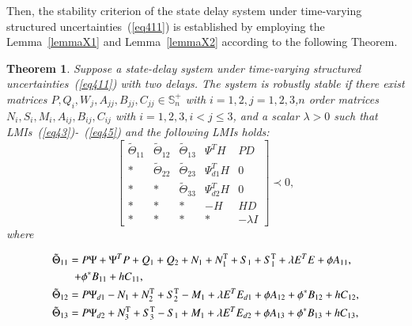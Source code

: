 \documentclass[journal]{IEEEtran}
\newtheorem{theorem}{Theorem}
\begin{document}
Then, the stability criterion of the state delay system under time-varying structured uncertainties~(\ref{eq411}) is established by employing the Lemma~\ref{lemmaX1} and Lemma~\ref{lemmaX2} according to the following Theorem.

\begin{theorem}
  Suppose a state-delay system under time-varying structured uncertainties~(\ref{eq411}) with two delays. The system is robustly stable if there exist matrices $P,Q_i,W_j,A_{jj},B_{jj},C_{jj}\in\mathbb{S}_n^+$ with $i=1,2,j=1,2,3$,$n$ order matrices $N_i,S_i,M_i,A_{ij},B_{ij},C_{ij}$ with $i=1,2,3,i<j\le3$, and a scalar $\lambda>0$ such that LMIs~(\ref{eq43})-~(\ref{eq45}) and the following LMIs holds:
  \begin{equation}
    \left[ {\begin{array}{*{20}{c}}
            {{{\tilde \Theta }_{11}}} & {{{\tilde \Theta }_{12}}} & {{{\tilde \Theta }_{13}}} & {{\Psi ^T}H}    & {PD}           \\
            *                         & {{{\tilde \Theta }_{22}}} & {{{\tilde \Theta }_{23}}} & {\Psi _{d1}^TH} & 0              \\
            *                         & *                         & {{{\tilde \Theta }_{33}}} & {\Psi _{d2}^TH} & 0              \\
            *                         & *                         & *                         & { - H}          & {HD}           \\
            *                         & *                         & *                         & *               & { - \lambda I}
          \end{array}} \right] \prec 0,
    \label{eq412}
  \end{equation}
  where
  \begin{small}
  \begin{equation*}
    \begin{gathered}
      {{\tilde \Theta }_{11}} = P\Psi  + {\Psi ^T}P + {Q_1} + {Q_2} + {N_1} + N_1^{\text{T}} + {S_1} + S_1^{\text{T}} + \lambda {E^T}E + \phi {A_{11}},\hfill\\
       \quad \quad + {\phi ^*}{B_{11}} + h{C_{11}}, \hfill \\
      {{\tilde \Theta }_{12}} = P{\Psi _{d1}} - {N_1} + N_2^{\text{T}} + S_2^{\text{T}} - {M_1} + \lambda {E^T}{E_{d1}} + \phi {A_{12}} + {\phi ^*}{B_{12}} + h{C_{12}}, \hfill \\
      {{\tilde \Theta }_{13}} = P{\Psi _{d2}} + N_3^{\text{T}} + S_3^{\text{T}} - {S_1} + {M_1} + \lambda {E^T}{E_{d2}} + \phi {A_{13}} + {\phi ^*}{B_{13}} + h{C_{13}}, \hfill \\

\end{gathered}
\end{equation*}
\end{small}
\end{theorem}
\end{document}

